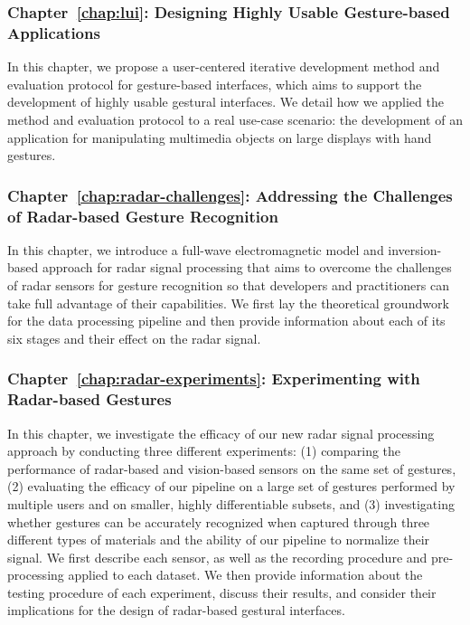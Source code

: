 \subsubsection{Chapter~\ref{chap:lui}: Designing Highly Usable Gesture-based Applications} 
In this chapter, we propose a user-centered iterative development method and evaluation protocol for gesture-based interfaces, which aims to support the development of highly usable gestural interfaces.
%
We detail how we applied the method and evaluation protocol to a real use-case scenario: the development of an application for manipulating multimedia objects on large displays with hand gestures. 

\subsubsection{Chapter~\ref{chap:radar-challenges}: Addressing the Challenges of Radar-based Gesture Recognition} 
In this chapter, we introduce a full-wave electromagnetic model and inversion-based approach for radar signal processing that aims to overcome the challenges of radar sensors for gesture recognition so that developers and practitioners can take full advantage of their capabilities.
%
We first lay the theoretical groundwork for the data processing pipeline and then provide information about each of its six stages and their effect on the radar signal.

\subsubsection{Chapter~\ref{chap:radar-experiments}: Experimenting with Radar-based Gestures}
In this chapter, we investigate the efficacy of our new radar signal processing approach by conducting three different experiments: (1) comparing the performance of radar-based and vision-based sensors on the same set of gestures, (2) evaluating the efficacy of our pipeline on a large set of gestures performed by multiple users and on smaller, highly differentiable subsets, and (3) investigating whether gestures can be accurately recognized when captured through three different types of materials and the ability of our pipeline to normalize their signal.
%
We first describe each sensor, as well as the recording procedure and pre-processing applied to each dataset. 
%
We then provide information about the testing procedure of each experiment, discuss their results, and consider their implications for the design of radar-based gestural interfaces.


